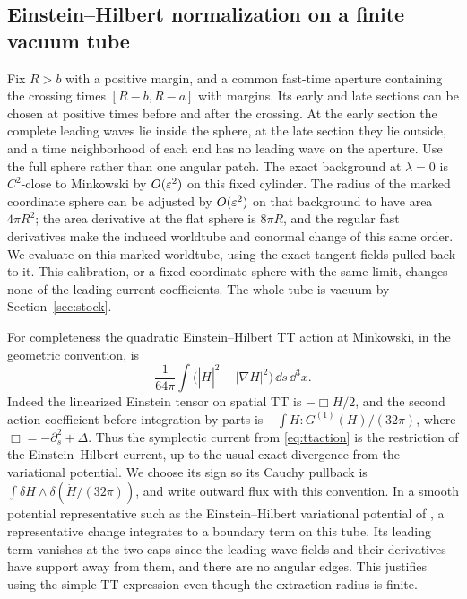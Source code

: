\subsection{Einstein--Hilbert normalization on a finite vacuum tube}

Fix \(R>b\) with a positive margin, and a common fast-time aperture containing the crossing times \([R-b,R-a]\) with margins. Its early and late sections can be chosen at positive times before and after the crossing. At the early section the complete leading waves lie inside the sphere, at the late section they lie outside, and a time neighborhood of each end has no leading wave on the aperture. Use the full sphere rather than one angular patch. The exact background at \(\lambda=0\) is \(C^2\)-close to Minkowski by \(O(\varepsilon^2)\) on this fixed cylinder. The radius of the marked coordinate sphere can be adjusted by \(O(\varepsilon^2)\) on that background to have area \(4\pi R^2\); the area derivative at the flat sphere is \(8\pi R\), and the regular fast derivatives make the induced worldtube and conormal change of this same order. We evaluate on this marked worldtube, using the exact tangent fields pulled back to it. This calibration, or a fixed coordinate sphere with the same limit, changes none of the leading current coefficients. The whole tube is vacuum by Section~\ref{sec:stock}.

For completeness the quadratic Einstein--Hilbert TT action at Minkowski, in the geometric convention, is
\begin{equation}
 \frac1{64\pi}\int\bigl(|\dot H|^2-|\nabla H|^2\bigr)\,\dd s\,\dd^3x .
 \label{eq:ttaction}
\end{equation}
Indeed the linearized Einstein tensor on spatial TT is \(-\Box H/2\), and the second action coefficient before integration by parts is \(-\int H:G^{(1)}(H)/(32\pi)\), where \(\Box=-\partial_s^2+\Delta\). Thus the symplectic current from \eqref{eq:ttaction} is the restriction of the Einstein--Hilbert current, up to the usual exact divergence from the variational potential. We choose its sign so its Cauchy pullback is \(\int\delta H\wedge\delta(\dot H/(32\pi))\), and write outward flux with this convention. In a smooth potential representative such as the Einstein--Hilbert variational potential of \cite{IyerWald}, a representative change integrates to a boundary term on this tube. Its leading term vanishes at the two caps since the leading wave fields and their derivatives have support away from them, and there are no angular edges. This justifies using the simple TT expression even though the extraction radius is finite.

